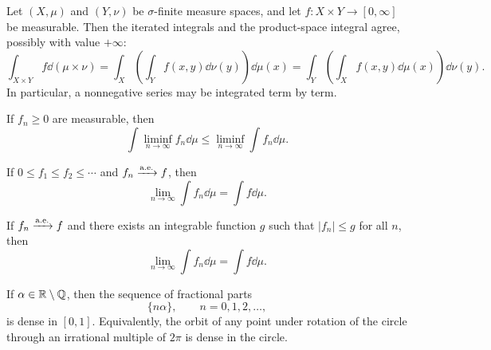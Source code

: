     \begin{theorem}
        Let $(X,\mu)$ and $(Y,\nu)$ be $\sigma$-finite measure spaces, and let
        $f\colon X\times Y\to[0,\infty]$ be measurable. Then the iterated integrals
        and the product-space integral agree, possibly with value $+\infty$:
        \[
            \int_{X\times Y}f\dd(\mu\times\nu)
            =
            \int_X\left(\int_Y f(x,y)\dd\nu(y)\right)\dd\mu(x)
            =
            \int_Y\left(\int_X f(x,y)\dd\mu(x)\right)\dd\nu(y).
        \]
        In particular, a nonnegative series may be integrated term by term.
    \end{theorem}

    \begin{theorem}
        If $f_n\geq 0$ are measurable, then
        \[
            \int \liminf_{n\to\infty}f_n\dd\mu
            \leq
            \liminf_{n\to\infty}\int f_n\dd\mu.
        \]
    \end{theorem}

    \begin{theorem}
        If $0\leq f_1\leq f_2\leq\cdots$ and $f_n\xrightarrow{\mathrm{a.e.}} f$,
        then
        \[
            \lim\limits_{n\to\infty}\int f_n\dd\mu
            =
            \int f\dd\mu.
        \]
    \end{theorem}

    \begin{theorem}
        If $f_n\xrightarrow{\mathrm{a.e.}} f$ and there exists an integrable function
        $g$ such that $|f_n|\leq g$ for all $n$, then
        \[
            \lim\limits_{n\to\infty}\int f_n\dd\mu
            =
            \int f\dd\mu.
        \]
    \end{theorem}

    \begin{theorem}\label{pp:density}
        If $\alpha\in\mathbb{R}\setminus\mathbb{Q}$, then the sequence of fractional parts
        \[
            \{n\alpha\},\qquad n=0,1,2,\dots,
        \]
        is dense in $[0,1]$. Equivalently, the orbit of any point under rotation
        of the circle through an irrational multiple of $2\pi$ is dense in the
        circle.
    \end{theorem}

